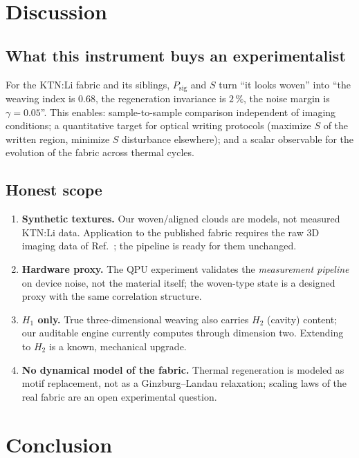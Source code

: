 \documentclass[11pt]{article}
\begin{document}
\section{Discussion}
\label{sec:limits}

\subsection{What this instrument buys an experimentalist}

For the KTN:Li fabric and its siblings, $P_{\mathrm{sig}}$ and $S$ turn
``it looks woven'' into ``the weaving index is $0.68$, the regeneration
invariance is $2\,\%$, the noise margin is $\gamma=0.05$''. This enables:
sample-to-sample comparison independent of imaging conditions; a
quantitative target for optical writing protocols (maximize $S$ of the
written region, minimize $S$ disturbance elsewhere); and a scalar observable
for the evolution of the fabric across thermal cycles.

\subsection{Honest scope}

\begin{enumerate}
\item \textbf{Synthetic textures.} Our woven/aligned clouds are models, not
measured KTN:Li data. Application to the published fabric requires the raw
3D imaging data of Ref.~\cite{Xin2026}; the pipeline is ready for them
unchanged.
\item \textbf{Hardware proxy.} The QPU experiment validates the
\emph{measurement pipeline} on device noise, not the material itself; the
woven-type state is a designed proxy with the same correlation structure.
\item \textbf{$H_1$ only.} True three-dimensional weaving also carries $H_2$
(cavity) content; our auditable engine currently computes through dimension
two. Extending to $H_2$ is a known, mechanical upgrade.
\item \textbf{No dynamical model of the fabric.} Thermal regeneration is
modeled as motif replacement, not as a Ginzburg--Landau relaxation; scaling
laws of the real fabric are an open experimental question.
\end{enumerate}

\section{Conclusion}
\end{document}
